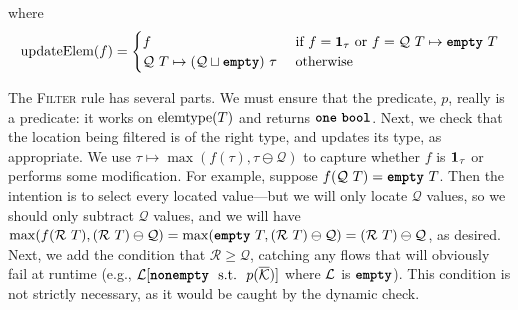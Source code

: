 \documentclass[nonacm, dvipsnames, sigconf]{acmart}
\begin{document}
\begin{mathpar}
\end{mathpar}

where
\[
    \updateElem(f) =
    \begin{cases}
        f & \tif f = \id{\tau} \tor f = \mathcal{Q}~T \mapsto \emptyq~T \\
        \mathcal{Q}~T \mapsto (\mathcal{Q} \sqcup \emptyq)~\tau & \owise
    \end{cases}
\]

The \textsc{Filter} rule has several parts.
We must ensure that the predicate, $p$, really is a predicate: it works on $\elemtype(T)$ and returns $\exactlyone~\boolt$.
Next, we check that the location being filtered is of the right type, and updates its type, as appropriate.
We use $\tau \mapsto \max(f(\tau), \tau \ominus \mathcal{Q})$ to capture whether $f$ is $\id{\tau}$ or performs some modification.
For example, suppose $f(\mathcal{Q}~T) = \emptyq~T$.
Then the intention is to select every located value---but we will only locate $\mathcal{Q}$ values, so we should only subtract $\mathcal{Q}$ values, and we will have $\max(f(\mathcal{R}~T), (\mathcal{R}~T) \ominus \mathcal{Q}) = \max(\emptyq~T, (\mathcal{R}~T) \ominus \mathcal{Q}) = (\mathcal{R}~T) \ominus \mathcal{Q}$, as desired.
Next, we add the condition that $\mathcal{R} \geq \mathcal{Q}$, catching any flows that will obviously fail at runtime (e.g., $\Loc[\nonempty~\tsuchthat~p(\overline{\LocK})]$ where $\Loc$ is $\emptyq$).
This condition is not strictly necessary, as it would be caught by the dynamic check.
\begin{mathpar}
\end{mathpar}
\end{document}
